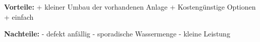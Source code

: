 \bigskip

\textbf{Vorteile:}								\newline
+	kleiner Umbau der vorhandenen Anlage			\newline
+	Kostengünstige Optionen						\newline
+	einfach										\newline
	
\textbf{Nachteile:}								\newline
- 	defekt anfällig								\newline
-	sporadische Wassermenge						\newline
-	kleine Leistung								\newline


